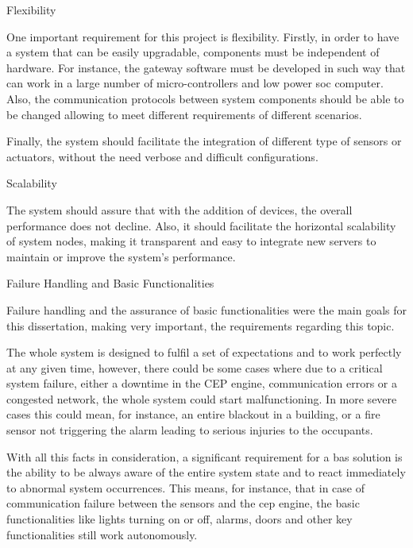 \begin{Paragraph}{Flexibility}

One important requirement for this project is flexibility. Firstly, in order to have a system that can be easily upgradable, components must be independent of hardware. For instance, the gateway software must be developed in such way that can work in a large number of micro-controllers and  low power \ac{soc} computer. Also, the communication protocols between system components should be able to be changed allowing to meet different requirements of different scenarios. 


Finally, the system should facilitate the integration of different type of sensors or actuators, without the need verbose and difficult configurations.

\end{Paragraph}

\begin{Paragraph}{Scalability}

The system should assure that with the addition of devices, the overall performance does not decline. Also, it should facilitate the horizontal scalability of system nodes, making it transparent and easy to integrate new servers to maintain or improve the system's performance.

\end{Paragraph}

\begin{Paragraph}{Failure Handling and Basic Functionalities}
	
Failure handling and the assurance of basic functionalities were the main goals for this dissertation, making very important, the requirements regarding this topic.

The whole system is designed to fulfil a set of expectations and to work perfectly at any given time, however, there could be some cases where due to a critical system failure, either a downtime in the CEP engine, communication errors or a congested network, the whole system could start malfunctioning. In more severe cases this could mean, for instance, an entire blackout in a building, or a fire sensor not triggering the alarm leading to serious injuries to the occupants.

With all this facts in consideration, a significant requirement for a \ac{bas} solution is the ability to be always aware of the entire system state and to react immediately to abnormal system occurrences. This means, for instance, that in case of communication failure between the sensors and the \ac{cep} engine, the basic functionalities like lights turning on or off, alarms, doors and other key functionalities still work autonomously.
\end{Paragraph}

